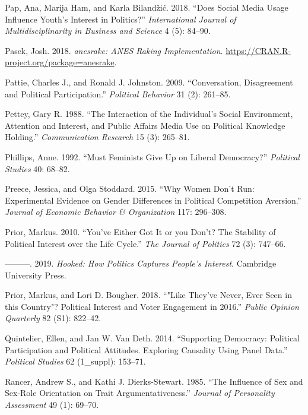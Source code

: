 \documentclass[
  letterpaper,
  DIV=11,
  numbers=noendperiod]{scrreprt}
\newlength{\cslhangindent}
\newenvironment{CSLReferences}[2] %
 {\begin{list}{}{%
  \setlength{\itemindent}{0pt}
  \setlength{\leftmargin}{0pt}
  \setlength{\parsep}{0pt}
  \ifodd #1
   \setlength{\leftmargin}{\cslhangindent}
   \setlength{\itemindent}{-1\cslhangindent}
  \fi
  \setlength{\itemsep}{#2\baselineskip}}}
 {\end{list}}
\begin{document}
\begin{CSLReferences}{1}{0}
Pap, Ana, Marija Ham, and Karla Bilandžić. 2018. {``{Does Social Media
Usage Influence Youth's Interest in Politics?}''} \emph{International
Journal of Multidisciplinarity in Business and Science} 4 (5): 84--90.

Pasek, Josh. 2018. \emph{{anesrake: ANES Raking Implementation}}.
\url{https://CRAN.R-project.org/package=anesrake}.

Pattie, Charles J., and Ronald J. Johnston. 2009. {``{Conversation,
Disagreement and Political Participation}.''} \emph{Political Behavior}
31 (2): 261--85.

Pettey, Gary R. 1988. {``{The Interaction of the Individual's Social
Environment, Attention and Interest, and Public Affairs Media Use on
Political Knowledge Holding}.''} \emph{Communication Research} 15 (3):
265--81.

Phillips, Anne. 1992. {``{Must Feminists Give Up on Liberal
Democracy?}''} \emph{Political Studies} 40: 68--82.

Preece, Jessica, and Olga Stoddard. 2015. {``{Why Women Don't Run:
Experimental Evidence on Gender Differences in Political Competition
Aversion}.''} \emph{Journal of Economic Behavior \& Organization} 117:
296--308.

Prior, Markus. 2010. {``{You've Either Got It or you Don't? The
Stability of Political Interest over the Life Cycle}.''} \emph{The
Journal of Politics} 72 (3): 747--66.

---------. 2019. \emph{{Hooked: How Politics Captures People's
Interest}}. Cambridge University Press.

Prior, Markus, and Lori D. Bougher. 2018. {``{"Like They've Never, Ever
Seen in this Country"? Political Interest and Voter Engagement in
2016}.''} \emph{Public Opinion Quarterly} 82 (S1): 822--42.

Quintelier, Ellen, and Jan W. Van Deth. 2014. {``{Supporting Democracy:
Political Participation and Political Attitudes. Exploring Causality
Using Panel Data}.''} \emph{Political Studies} 62 (1\_suppl): 153--71.

Rancer, Andrew S., and Kathi J. Dierks-Stewart. 1985. {``{The Influence
of Sex and Sex-Role Orientation on Trait Argumentativeness}.''}
\emph{Journal of Personality Assessment} 49 (1): 69--70.


\end{CSLReferences}
\end{document}
